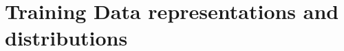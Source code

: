 \documentclass[12pt]{report}
\DeclareMathOperator{\nrm}{\mathrm{n}}
\DeclareMathOperator{\drm}{\mathrm{d}}
\DeclareMathOperator{\Xcal}{\mathcal{X}}
\DeclareMathOperator{\Ycal}{\mathcal{Y}}
\DeclareMathOperator{\Scal}{\mathcal{S}}
\DeclareMathOperator{\DMP}{\mathrm{DMP}}
\DeclareMathOperator{\uppsim}{\uppsi_\text{m}}
\begin{document}
%
%
%
%
%
%
%






\section{Training Data representations and distributions}
\end{document}
